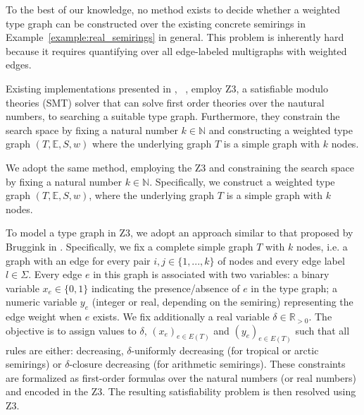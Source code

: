 To the best of our knowledge, no method exists to decide whether a weighted type graph can be constructed over the existing concrete semirings in  Example~\ref{example:real_semirings} in general. 
This problem is inherently hard because it requires quantifying over all edge-labeled multigraphs with weighted edges.

Existing implementations presented in \cite[]{bruggink2015proving}, ~\cite[]{zantema2014termination}, \cite[\textsection E]{endrullis2024generalized} employ Z3, a satisfiable modulo theories (SMT) solver that can solve first order theories over the nautural numbers, to searching a suitable type graph.
Furthermore, they constrain the search space by fixing a natural number
\( k \mathop{\in} \mathbb{N} \) and constructing a weighted type graph \((T, \mathbb{E}, S, w)\) where the underlying graph \( T \) is a simple graph with \( k \) nodes.

We adopt the same method, employing the Z3 and constraining the search space by fixing a natural number \( k \mathop{\in} \mathbb{N} \). Specifically, we construct a weighted type graph \((T, \mathbb{E}, S, w)\), where the underlying graph \( T \) is a simple graph with \( k \) nodes.

To model a type graph in Z3, we adopt an approach similar to that proposed by Bruggink in \cite[]{bruggink2015proving}.
Specifically, we fix a complete simple graph $T$ with $k$ nodes, i.e. a graph with an edge for every pair $i,j\in\{1,...,k\}$ of nodes and every edge label $l \mathop{\in} \Sigma$. 
Every edge $e$ in this graph is associated with two variables:
a binary variable \( x_e \mathop{\in} \{0,1\} \) indicating the presence/absence of \( e \) in the type graph;
a numeric variable \( y_e \) (integer or real, depending on the semiring) representing the edge weight when \( e \) exists.  
We fix additionally a real variable $\delta \mathop{\in} \mathbb{R}_{>0}$.
The objective is to assign values to $\delta$, \( (x_e)_{e \mathop{\in} E(T)} \) and \( (y_e)_{e \mathop{\in} E(T)} \) such that all rules are either: decreasing, $\delta$-uniformly decreasing (for tropical or arctic semirings) or \(\delta\)-closure decreasing (for arithmetic semirings).  
These constraints are formalized as first-order formulas over the natural numbers (or real numbers) and encoded in the Z3. The resulting satisfiability problem is then resolved using Z3.

